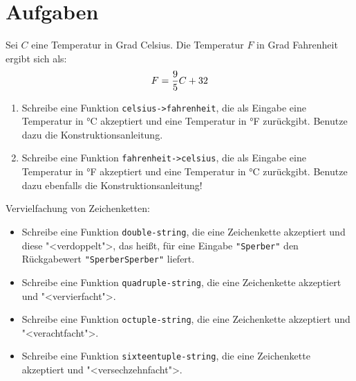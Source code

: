 \section*{Aufgaben}

\begin{aufgabe}
  Sei $C$ eine Temperatur in Grad Celsius.  Die
  Temperatur $F$ in Grad Fahrenheit ergibt sich als:
  \begin{displaymath}
    F = {9 \over 5} C + 32
  \end{displaymath}
  
  \begin{enumerate} 
  \item Schreibe eine Funktion \lstinline{celsius->fahrenheit}, die als
    Eingabe eine Temperatur in \si{\degree}C akzeptiert und eine
    Temperatur in \si{\degree}F zurückgibt.  Benutze dazu die
    Konstruktionsanleitung.
    
  \item Schreibe eine Funktion \lstinline{fahrenheit->celsius}, die als
    Eingabe eine Temperatur in \si{\degree}F akzeptiert und eine
    Temperatur in \si{\degree}C zurückgibt.  Benutze dazu
    ebenfalls die Konstruktionsanleitung!
  \end{enumerate}
\end{aufgabe}  

\begin{aufgabe}
 Vervielfachung von Zeichenketten:
 \begin{itemize}
  \item Schreibe eine Funktion \lstinline{double-string}, die eine Zeichenkette akzeptiert und
    diese "<verdoppelt">, das heißt, für eine Eingabe \lstinline{"Sperber"} den
    Rückgabewert \lstinline{"SperberSperber"} liefert.
    
  \item Schreibe eine Funktion \lstinline{quadruple-string}, die eine
    Zeichenkette akzeptiert und "<vervierfacht">.

  \item Schreibe eine Funktion \lstinline{octuple-string}, die eine
    Zeichenkette akzeptiert und "<verachtfacht">.

  \item Schreibe eine Funktion \lstinline{sixteentuple-string}, die
    eine Zeichenkette akzeptiert und "<versechzehnfacht">.
  \end{itemize}


\end{aufgabe}

